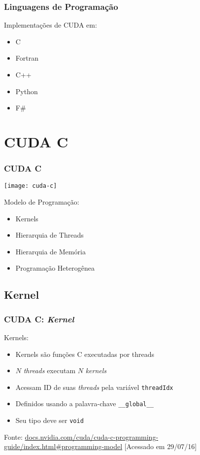 \documentclass[10pt, compress]{beamer}
\begin{document}
\begin{frame}
    \frametitle{Linguagens de Programação}
    Implementações de CUDA em:
    \begin{itemize}
        \item \alert{C}
        \item Fortran
        \item C++
        \item Python
        \item F\#
    \end{itemize}
\end{frame}

\section{CUDA C}

\begin{frame}
    \frametitle{CUDA C}
    \begin{center}
        \texttt{[image: cuda-c]}
    \end{center}

    Modelo de Programação:
    \begin{itemize}
        \item \alert{Kernels}
        \item Hierarquia de \alert{Threads}
        \item Hierarquia de \alert{Memória}
        \item Programação \alert{Heterogênea}
    \end{itemize}
\end{frame}

\subsection{Kernel}

\begin{frame}
    \frametitle{CUDA C: \textit{Kernel}}
    \alert{Kernels}:
    \begin{itemize}
        \item \alert{Kernels} são funções C executadas por \alert{threads}
        \item $N$ \textit{threads} executam $N$ \textit{kernels}
        \item Acessam \alert{ID} de suas \textit{threads} pela variável \alert{\texttt{threadIdx}}
        \item Definidos usando a palavra-chave \alert{\texttt{\_\_global\_\_}}
        \item Seu tipo deve ser \alert{\texttt{void}}
    \end{itemize}

    \vfill

    \begin{center}
        \tiny{Fonte: \url{docs.nvidia.com/cuda/cuda-c-programming-guide/index.html\#programming-model} [Acessado em 29/07/16]}
    \end{center}
\end{frame}
\end{document}

